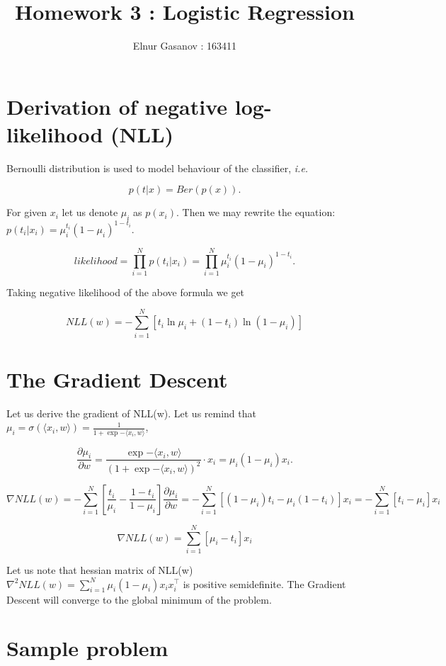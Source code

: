 \documentclass{article}
\title{Homework 3 : Logistic Regression}
\author{Elnur Gasanov : 163411}
\date{}
\begin{document}
\maketitle

\section{Derivation of negative log-likelihood (NLL)}

Bernoulli distribution is used to model behaviour of the classifier, \textit{i.e.}

$$
p(t|x) = Ber(p(x)).
$$

For given $x_i$ let us denote $\mu_i$ as $p(x_i)$. Then we may rewrite the equation: $p(t_i | x_i) = \mu_i^{t_i} (1 - \mu_i)^{1 - t_i}$.

$$
likelihood = \prod_{i=1}^N p(t_i | x_i) = \prod_{i=1}^N \mu_i^{t_i} (1 - \mu_i)^{1 - t_i}.
$$

Taking negative likelihood of the above formula we get

\begin{equation*}
\boxed{NLL(w) = -\sum\limits_{i=1}^N [t_i \ln \mu_i + (1 - t_i)\ln(1 - \mu_i)]}
\end{equation*}

\section{The Gradient Descent}

Let us derive the gradient of NLL(w). Let us remind that $\mu_i = \sigma(\langle x_i, w \rangle) = \frac{1}{1 + \exp{-\langle x_i, w \rangle}}$,

$$
\frac{\partial \mu_i}{\partial w} = \frac{\exp{-\langle x_i, w \rangle}}{(1 + \exp{-\langle x_i, w \rangle})^2} \cdot x_i = \mu_i (1 - \mu_i) x_i.
$$

$$
\nabla NLL(w) = -\sum\limits_{i=1}^N \left[\frac{t_i}{\mu_i} - \frac{1 - t_i}{1 - \mu_i}\right]\frac{\partial \mu_i}{\partial w} = -\sum\limits_{i=1}^N [(1-\mu_i)t_i -\mu_i(1-t_i)]x_i = -\sum\limits_{i=1}^N [t_i-\mu_i]x_i
$$

$$
\boxed{\nabla NLL(w) = \sum\limits_{i=1}^N [\mu_i-t_i]x_i}
$$

Let us note that hessian matrix of NLL(w) $\nabla^2 NLL(w) = \sum\limits_{i=1}^N \mu_i(1-\mu_i) x_i x_i^\intercal$ is positive semidefinite. The Gradient Descent will converge to the global minimum of the problem.

\section{Sample problem}
\end{document}
